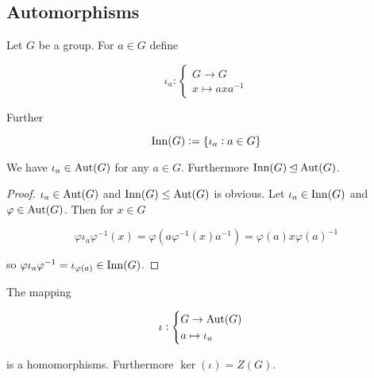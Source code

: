 \subsection{Automorphisms}

\begin{definition}
	Let $G$ be a group. For $a \in G$ define 

	\begin{equation}
		\iota_a: \begin{cases}
			G \to G\\
			x \mapsto axa^{-1}
		\end{cases}
	\end{equation}

	Further

	\begin{equation}
		\Inn(G) := \cbr[0]{\iota_a : a \in G}
	\end{equation}
\end{definition}

\vspace{2mm}

\begin{lemma}
	We have $\iota_a \in \operatorname{Aut}(G)$ for any $a \in G$. Furthermore $\operatorname{Inn}(G) \unlhd \operatorname{Aut}(G)$.
\end{lemma}

\begin{proof}
	$\iota_a \in \operatorname{Aut}(G)$ and $\operatorname{Inn}(G) \leq \operatorname{Aut}(G)$ is obvious. Let $\iota_a \in \operatorname{Inn}(G)$ and $\varphi \in \operatorname{Aut}(G)$. Then for $x \in G$ 

	\begin{equation*}
		\varphi\iota_a\varphi^{-1}(x) = \varphi(a \varphi^{-1}(x)a^{-1}) = \varphi(a)x\varphi(a)^{-1}
	\end{equation*}

	\noindent so $\varphi \iota_{a} \varphi^{-1} = \iota_{\varphi(a)} \in \operatorname{Inn}(G)$.
\end{proof}

\vspace{2mm}

\begin{lemma}
	The mapping 

	\begin{equation}
		\iota: \begin{cases}
			G \to \operatorname{Aut}(G)\\
			a \mapsto \iota_a
		\end{cases}
	\end{equation}

	\noindent is a homomorphisms. Furthermore $\ker(\iota) = Z(G)$.
\end{lemma}

